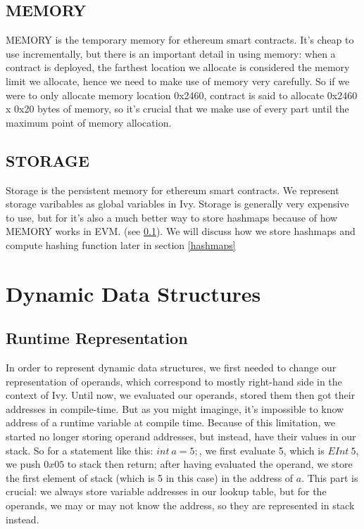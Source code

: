 \documentclass{article}
\begin{document}
\subsection{MEMORY}
\label{memory}
MEMORY is the temporary memory for ethereum smart contracts. It's cheap to use incrementally, but there is an important detail in using memory: when a contract is deployed, the farthest location we allocate is considered the memory limit we allocate, hence we need to make use of memory very carefully. So if we were to only allocate memory location 0x2460, contract is said to allocate 0x2460 x 0x20 bytes of memory, so it's crucial that we make use of every part until the maximum point of memory allocation.
\subsection{STORAGE}
Storage is the persistent memory for ethereum smart contracts. We represent storage varibables as global variables in Ivy. Storage is generally very expensive to use, but for it's also a much better way to store hashmaps because of how MEMORY works in EVM. (see \ref{memory}). We will discuss how we store hashmaps and compute hashing function later in section \ref{hashmaps}

\section{Dynamic Data Structures}
\subsection{Runtime Representation}
\label{runtime-rep}
In order to represent dynamic data structures, we first needed to change our representation of operands, which correspond to mostly right-hand side in the context of Ivy. Until now, we evaluated our operands, stored them then got their addresses in compile-time. But as you might imaginge, it's impossible to know address of a runtime variable at compile time. Because of this limitation, we started no longer storing operand addresses, but instead, have their values in our stack. So for a statement like this: $int\ a = 5;$, we first evaluate 5, which is $EInt\ 5$, we push $0x05$ to stack then return; after having evaluated the operand, we store the first element of stack (which is 5 in this case) in the address of $a$. This part is crucial: we always store variable addresses in our lookup table, but for the operands, we may or may not know the address, so they are represented in stack instead.
\end{document}
